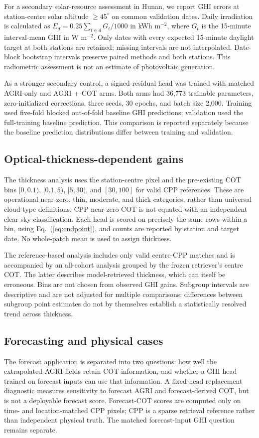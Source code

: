 \documentclass[11pt]{article}
\begin{document}
For a secondary solar-resource assessment in Hunan, we report GHI errors at station-centre solar altitude $\geq 45^\circ$ on common validation dates. Daily irradiation is calculated as $E_d=0.25\sum_{t\in d}G_t/1000$ in kWh m$^{-2}$, where $G_t$ is the 15-minute interval-mean GHI in W m$^{-2}$. Only dates with every expected 15-minute daylight target at both stations are retained; missing intervals are not interpolated. Date-block bootstrap intervals preserve paired methods and both stations. This radiometric assessment is not an estimate of photovoltaic generation.

As a stronger secondary control, a signed-residual head was trained with matched AGRI-only and AGRI + COT arms. Both arms had 36,773 trainable parameters, zero-initialized corrections, three seeds, 30 epochs, and batch size 2,000. Training used five-fold blocked out-of-fold baseline GHI predictions; validation used the full-training baseline prediction. This comparison is reported separately because the baseline prediction distributions differ between training and validation.

\subsection{Optical-thickness-dependent gains}
The thickness analysis uses the station-centre pixel and the pre-existing COT bins $[0,0.1)$, $[0.1,5)$, $[5,30)$, and $[30,100]$ for valid CPP references. These are operational near-zero, thin, moderate, and thick categories, rather than universal cloud-type definitions. CPP near-zero COT is not equated with an independent clear-sky classification. Each head is scored on precisely the same rows within a bin, using Eq.~(\ref{eq:endpoint}), and counts are reported by station and target date. No whole-patch mean is used to assign thickness.

The reference-based analysis includes only valid centre-CPP matches and is accompanied by an all-cohort analysis grouped by the frozen retriever's centre COT. The latter describes model-retrieved thickness, which can itself be erroneous. Bins are not chosen from observed GHI gains. Subgroup intervals are descriptive and are not adjusted for multiple comparisons; differences between subgroup point estimates do not by themselves establish a statistically resolved trend across thickness.

\subsection{Forecasting and physical cases}
The forecast application is separated into two questions: how well the extrapolated AGRI fields retain COT information, and whether a GHI head trained on forecast inputs can use that information. A fixed-head replacement diagnostic measures sensitivity to forecast AGRI and forecast-derived COT, but is not a deployable forecast score. Forecast-COT scores are computed only on time- and location-matched CPP pixels; CPP is a sparse retrieval reference rather than independent physical truth. The matched forecast-input GHI question remains separate.
\end{document}
